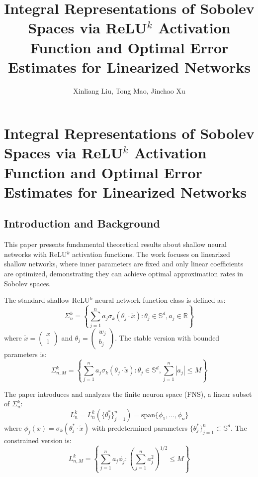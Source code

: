 \documentclass[11pt]{article}
\title{Integral Representations of Sobolev Spaces via ReLU$^k$ Activation Function and Optimal Error Estimates for Linearized Networks}
\author{Xinliang Liu, Tong Mao, Jinchao Xu}
\date{}
\begin{document}
\maketitle

\section{Integral Representations of Sobolev Spaces via ReLU$^k$ Activation Function and Optimal Error Estimates for Linearized Networks}

\subsection{Introduction and Background}

This paper presents fundamental theoretical results about shallow neural networks with ReLU$^k$ activation functions. The work focuses on linearized shallow networks, where inner parameters are fixed and only linear coefficients are optimized, demonstrating they can achieve optimal approximation rates in Sobolev spaces.

The standard shallow ReLU$^k$ neural network function class is defined as:
\begin{equation}
\Sigma_n^k = \left\{\sum_{j=1}^n a_j \sigma_k(\theta_j \cdot \tilde{x}) : \theta_j \in \mathbb{S}^d, a_j \in \mathbb{R} \right\}
\end{equation}
where $\tilde{x} = \begin{pmatrix} x \\ 1 \end{pmatrix}$ and $\theta_j = \begin{pmatrix} w_j \\ b_j \end{pmatrix}$. The stable version with bounded parameters is:
\begin{equation}
\Sigma_{n,M}^k = \left\{\sum_{j=1}^n a_j \sigma_k(\theta_j \cdot \tilde{x}) : \theta_j \in \mathbb{S}^d, \sum_{j=1}^n |a_j| \leq M \right\}
\end{equation}

The paper introduces and analyzes the finite neuron space (FNS), a linear subset of $\Sigma_n^k$:
\begin{equation}
L_n^k = L_n^k(\{\theta_j^*\}_{j=1}^n) = \text{span} \{\phi_1, \ldots, \phi_n\}
\end{equation}
where $\phi_j(x) = \sigma_k(\theta_j^* \cdot \tilde{x})$ with predetermined parameters $\{\theta_j^*\}_{j=1}^n \subset \mathbb{S}^d$. The constrained version is:
\begin{equation}
L_{n,M}^k = \left\{\sum_{j=1}^n a_j \phi_j : \left(\sum_{j=1}^n a_j^2\right)^{1/2} \leq M \right\}
\end{equation}
\end{document}

